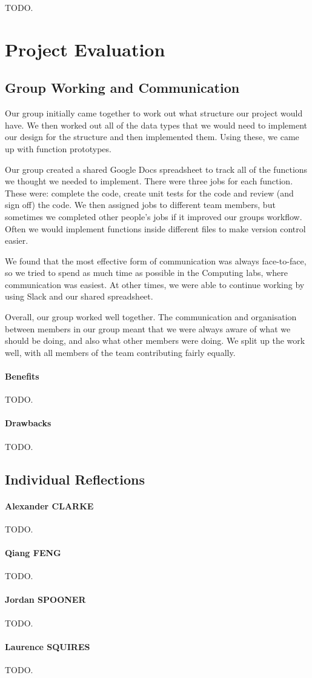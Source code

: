 \documentclass[10pt]{article}
\begin{document}
TODO.

\section{Project Evaluation}

\subsection{Group Working and Communication}

Our group initially came together to work out what structure our project would have. We then worked out all of the data types that we would need to implement our design for the structure and then implemented them. Using these, we came up with function prototypes.

Our group created a shared Google Docs spreadsheet to track all of the functions we thought we needed to implement. There were three jobs for each function. These were: complete the code, create unit tests for the code and review (and sign off) the code. We then assigned jobs to different team members, but sometimes we completed other people's jobs if it improved our groups workflow. Often we would implement functions inside different files to make version control easier.

We found that the most effective form of communication was always face-to-face, so we tried to spend as much time as possible in the Computing labs, where communication was easiest. At other times, we were able to continue working by using Slack and our shared spreadsheet.

Overall, our group worked well together. The communication and organisation between members in our group meant that we were always aware of what we should be doing, and also what other members were doing. We split up the work well, with all members of the team contributing fairly equally.

\paragraph{Benefits}
TODO.

\paragraph{Drawbacks}
TODO.

\subsection{Individual Reflections}

\paragraph{Alexander CLARKE}
TODO.

\paragraph{Qiang FENG}
TODO.

\paragraph{Jordan SPOONER}
TODO.

\paragraph{Laurence SQUIRES}
TODO.
\end{document}
